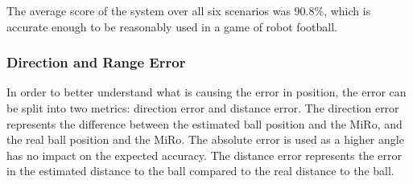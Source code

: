 The average score of the system over all six scenarios was 90.8\%, which is accurate enough to be reasonably used in a game of robot football.
 
\subsubsection{Direction and Range Error}

In order to better understand what is causing the error in position, the error can be split into two metrics: direction error and distance error. The direction error represents the difference between the estimated ball position and the MiRo, and the real ball position and the MiRo. The absolute error is used as a higher angle has no impact on the expected accuracy. The distance error represents the error in the estimated distance to the ball compared to the real distance to the ball. 

